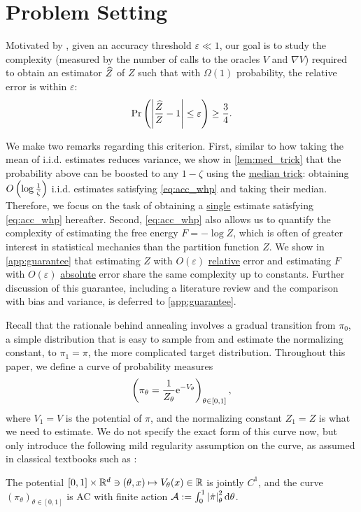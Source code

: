 \section{Problem Setting}
\label{sec:prob_setting}
Motivated by \cite{brosse2018normalizing,ge2020estimating}, given an accuracy threshold $\varepsilon\ll1$, our goal is to study the complexity (measured by the number of calls to the oracles $V$ and $\nabla V$) required to obtain an estimator $\widehat{Z}$ of $Z$ such that with $\Omega(1)$ probability, the relative error is within $\varepsilon$:
\begin{equation}
    \operatorname{Pr}\left(\left|\frac{\widehat{Z}}{Z}-1\right|\le\varepsilon\right)\ge\frac{3}{4}.
    \label{eq:acc_whp}
\end{equation}

\begin{remark}
We make two remarks regarding this criterion. 
First, similar to how taking the mean of i.i.d. estimates reduces variance, we show in \cref{lem:med_trick} that the probability above can be boosted to any $1-\zeta$
using the \underline{median trick}: obtaining $O\left(\log\frac{1}{\zeta}\right)$ i.i.d. estimates satisfying \cref{eq:acc_whp} and taking their median. Therefore, we focus on the task of obtaining a \underline{single} estimate satisfying \cref{eq:acc_whp} hereafter.
Second, \cref{eq:acc_whp} also allows us to quantify the complexity of estimating the free energy $F=-\log Z$, which is often of greater interest in statistical mechanics than the partition function $Z$. We show in \cref{app:guarantee} that estimating $Z$ with $O(\varepsilon)$ \underline{relative} error and estimating $F$ with $O(\varepsilon)$ \underline{absolute} error share the same complexity up to constants. 
Further discussion of this guarantee, including a literature review and the comparison with bias and variance, is deferred to \cref{app:guarantee}.
\label{rmk:guarantee}
\end{remark}

Recall that the rationale behind annealing involves a gradual transition from $\pi_0$, a simple distribution that is easy to sample from and estimate the normalizing constant, to $\pi_1=\pi$, the more complicated target distribution. Throughout this paper, we define a curve of probability measures 
$$\left(\pi_\theta=\frac{1}{Z_\theta}\mathrm{e}^{-V_\theta}\right)_{\theta\in[0,1]},$$
where $V_1=V$ is the potential of $\pi$, and the normalizing constant $Z_1=Z$ is what we need to estimate. We do not specify the exact form of this curve now, but only introduce the following mild regularity assumption on the curve, as assumed in classical textbooks such as \cite{ambrosio2008gradient,ambrosio2021lectures,santambrogio2015optimal}:
\begin{assumption}
    The potential $[0,1]\times\mathbb{R}^d\ni(\theta,x)\mapsto V_\theta(x)\in\mathbb{R}$ is jointly $C^1$, and the curve $(\pi_\theta)_{\theta\in[0,1]}$ is AC with finite action $\mathcal{A}:=\int_0^1\left|\dot\pi\right|_\theta^2\mathrm{d}\theta$.
    \label{assu:AC}
\end{assumption}

